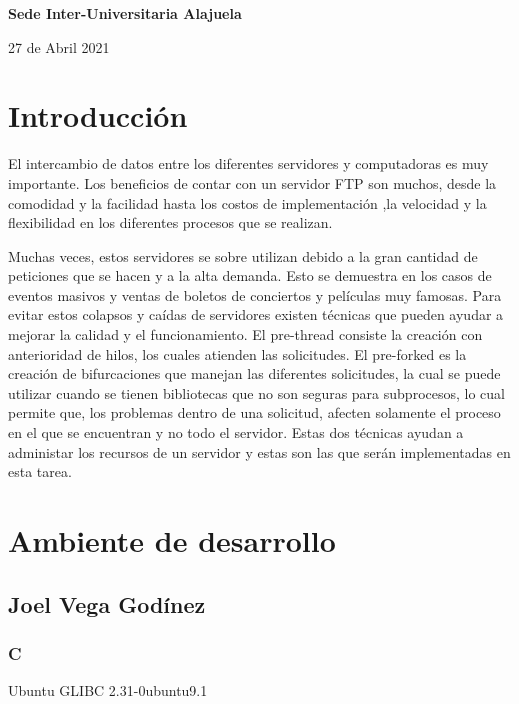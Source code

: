 \documentclass[a4paper,12pt,twoside]{article}
\begin{document}
\vspace*{1.5cm}
\begin{center}
{{\bf \large Sede Inter-Universitaria Alajuela \par{27 de Abril 2021}}}
\end{center}

\vspace*{.05cm}


\renewcommand{\thefootnote}{\arabic{footnote}}

\setcounter{footnote}{1}

\pagebreak

\baselineskip 19pt

\newpage
\tableofcontents
\newpage
\section{Introducción}
El intercambio de datos entre los diferentes servidores y computadoras es muy importante. Los beneficios de contar con un servidor FTP son muchos, desde la comodidad y la facilidad hasta los costos de implementación ,la velocidad y la flexibilidad en los diferentes procesos que se realizan. 

Muchas veces, estos servidores se sobre utilizan debido a la gran cantidad de peticiones que se hacen y a la alta demanda. Esto se demuestra en los casos de eventos masivos y ventas de boletos de conciertos y películas muy famosas. Para evitar estos colapsos y caídas de servidores existen técnicas que pueden ayudar a mejorar la calidad y el funcionamiento. El pre-thread consiste la creación con anterioridad de hilos, los cuales atienden las solicitudes. El pre-forked es la creación de bifurcaciones que manejan las diferentes solicitudes, la cual se puede utilizar cuando se tienen bibliotecas que no son seguras para subprocesos, lo cual permite que, los problemas dentro de una solicitud, afecten solamente el proceso en el que se encuentran y no todo el servidor. Estas dos técnicas ayudan a administar los recursos de un servidor y estas son las que serán implementadas en esta tarea. 

\newpage
\section{Ambiente de desarrollo}
\subsection{Joel Vega Godínez}
\subsubsection{C}
Ubuntu GLIBC 2.31-0ubuntu9.1
\end{document}
